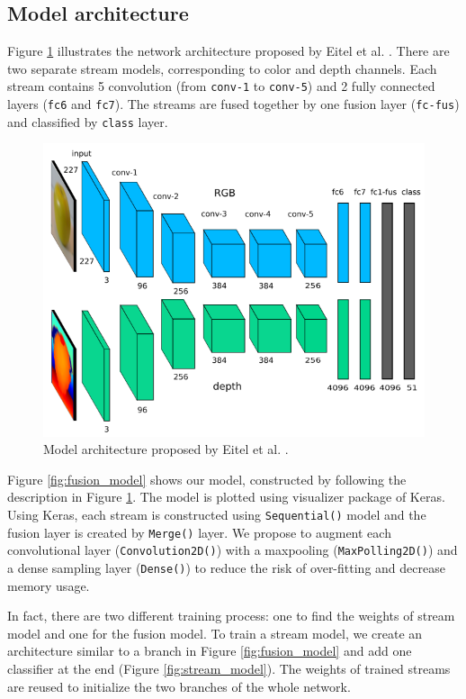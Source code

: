 \documentclass[paper=letter, fontsize=12pt]{article}
\begin{document}
\subsection{Model architecture} \label{sec:model_architecture}
Figure \ref{fig:architecture_eitel} illustrates the network architecture proposed by Eitel et al. \cite{Eitel2015}. There are two separate stream models, corresponding to color and depth channels. Each stream contains 5 convolution (from \texttt{conv-1} to \texttt{conv-5}) and 2 fully connected layers (\texttt{fc6} and \texttt{fc7}). The streams are fused together by one fusion layer (\texttt{fc-fus}) and classified by \texttt{class} layer.
\begin{figure}[htbp]
	\centering
	\includegraphics[width=.7\textwidth]{architecture}
	\caption{Model architecture proposed by Eitel et al. \cite{Eitel2015}.}
	\label{fig:architecture_eitel}
\end{figure}

Figure \ref{fig:fusion_model} shows our model, constructed by following the description in Figure \ref{fig:architecture_eitel}. The model is plotted using visualizer package of Keras. Using Keras, each stream is constructed using \texttt{Sequential()} model and the fusion layer is created by \texttt{Merge()} layer. We propose to augment each convolutional layer (\texttt{Convolution2D()}) with a maxpooling (\texttt{MaxPolling2D()}) and a dense sampling layer (\texttt{Dense()}) to reduce the risk of over-fitting and decrease memory usage.

In fact, there are two different training process: one to find the weights of stream model and one for the fusion model. To train a stream model, we create an architecture similar to a branch in Figure \ref{fig:fusion_model} and add one classifier at the end (Figure \ref{fig:stream_model}). The weights of trained streams are reused to initialize the two branches of the whole network.
\end{document}
